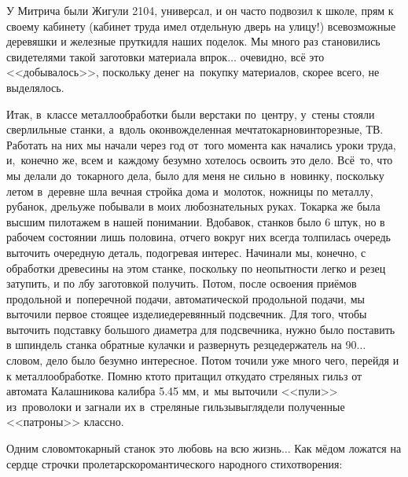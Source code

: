 У Митрича были Жигули 2104, универсал, и он часто подвозил к школе, прям к своему кабинету (кабинет труда имел отдельную дверь на улицу!) всевозможные деревяшки и железные прутки\mdash для наших поделок. Мы много раз становились свидетелями такой заготовки материала впрок$\ldots$ очевидно, всё это <<добывалось>>, поскольку денег на~покупку материалов, скорее всего, не выделялось.

Итак, в~классе металлообработки были верстаки по~центру, у~стены стояли сверлильные станки, а~вдоль окон\mdash вожделенная мечта\mdash токарно\sdash винторезные, ТВ. Работать на них мы начали через год от~того момента как начались уроки труда, и,~конечно же, всем и~каждому безумно хотелось освоить это дело. Всё~то, что мы делали до~токарного дела, было для меня не сильно в~новинку, поскольку летом в~деревне шла вечная стройка дома и~молоток, ножницы по металлу, рубанок, дрель\mdash уже побывали в моих любознательных руках. Токарка же была высшим пилотажем в нашей понимании. Вдобавок, станков было 6 штук, но в рабочем состоянии лишь половина, отчего вокруг них всегда толпилась очередь выточить очередную деталь, подогревая интерес. Начинали мы, конечно, с обработки древесины на этом станке, поскольку по неопытности легко и резец затупить, и по лбу заготовкой получить. Потом, после освоения приёмов продольной и~поперечной подачи, автоматической продольной подачи, мы выточили первое стоящее изделие\mdash деревянный подсвечник. Для того, чтобы выточить подставку большого диаметра для подсвечника, нужно было поставить в шпиндель станка обратные кулачки и развернуть резцедержатель на 90\degree$\ldots$ словом, дело было безумно интересное. Потом точили уже много чего, перейдя и к металлообработке. Помню кто\sdash то притащил откуда\sdash то стреляных гильз от автомата Калашникова калибра 5.45 мм, и~мы выточили <<пули>> из~проволоки и загнали их в~стреляные гильзы\mdash выглядели полученные <<патроны>> классно. 

Одним словом\mdash токарный станок это любовь на всю жизнь$\ldots$ Как мёдом ложатся на сердце строчки пролетарско\sdash романтического народного стихотворения:

